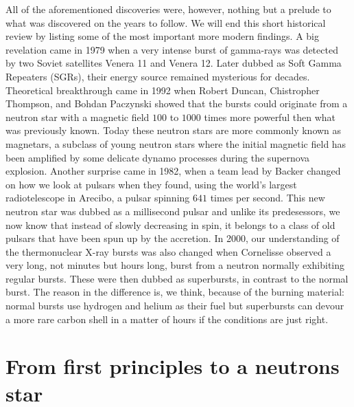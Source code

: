 %
%
All of the aforementioned discoveries were, however, nothing but a prelude to what was discovered on the years to follow.
We will end this short historical review by listing some of the most important more modern findings.
A big revelation came in 1979 when a very intense burst of gamma-rays was detected by two Soviet satellites Venera 11 and Venera 12.\cite{MGI79}
Later dubbed as Soft Gamma Repeaters (SGRs), their energy source remained mysterious for decades.
Theoretical breakthrough came in 1992 when Robert Duncan, Chistropher Thompson, and Bohdan Paczynski showed that the bursts could originate from a neutron star with a magnetic field $100$ to $1000$ times more powerful then what was previously known.\cite{DT92}
Today these neutron stars are more commonly known as magnetars, a subclass of young neutron stars where the initial magnetic field has been amplified by some delicate dynamo processes during the supernova explosion.
Another surprise came in 1982, when a team lead by Backer changed on how we look at pulsars when they found, using the world's largest radiotelescope in Arecibo, a pulsar spinning $641$ times per second.\cite{BKH82}
This new neutron star was dubbed as a millisecond pulsar and unlike its predesessors, we now know that instead of slowly decreasing in spin, it belongs to a class of old pulsars that have been spun up by the accretion.
In 2000, our understanding of the thermonuclear X-ray bursts was also changed when Cornelisse observed a very long, not minutes but hours long, burst from a neutron normally exhibiting regular bursts.\cite{CHK00}
These were then dubbed as superbursts, in contrast to the normal burst.
The reason in the difference is, we think, because of the burning material:
normal bursts use hydrogen and helium as their fuel but superbursts can devour a more rare carbon shell in a matter of hours if the conditions are just right.




\section{From first principles to a neutrons star}

